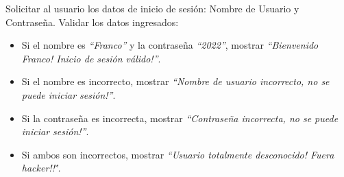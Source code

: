 Solicitar al usuario los datos de inicio de sesi\'on: Nombre de Usuario y Contrase\~na. Validar los datos ingresados:
\begin{itemize}
    \item Si el nombre es \textit{``Franco''} y la contrase\~na \textit{``2022''}, mostrar \textit{``Bienvenido Franco! Inicio de sesi\'on v\'alido!''}.
    \item Si el nombre es incorrecto, mostrar \textit{``Nombre de usuario incorrecto, no se puede iniciar sesi\'on!''}.
    \item Si la contrase\~na es incorrecta, mostrar \textit{``Contrase\~na incorrecta, no se puede iniciar sesi\'on!''}.
    \item Si ambos son incorrectos, mostrar \textit{``Usuario totalmente desconocido! Fuera hacker!!\''.}
\end{itemize}



\volverindice
\newpage
